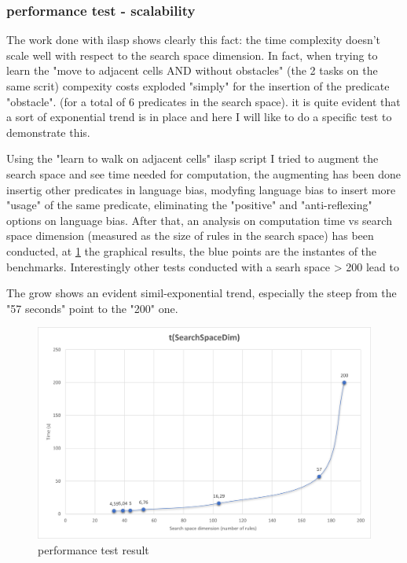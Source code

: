 \subsubsection{performance test - scalability}
The work done with ilasp shows clearly this fact: the time complexity doesn't scale well with respect to the search space dimension. In fact, when trying to learn the "move to adjacent cells AND without obstacles" (the 2 tasks on the same scrit) compexity costs exploded "simply" for the insertion of the predicate "obstacle". (for a total of 6 predicates in the search space). it is quite evident that a sort of exponential trend is in place and here I will like to do a specific test to demonstrate this.

Using the "learn to walk on adjacent cells" ilasp script I tried to augment the search space and see time needed for computation, the augmenting has been done insertig other predicates in language bias, modyfing language bias to insert more "usage" of the same predicate, eliminating the "positive" and "anti-reflexing" options on language bias. After that, an analysis on computation time vs search space dimension (measured as the size of rules in the search space) has been conducted, at \ref{fig:asd4} the graphical results, the blue points are the instantes of the benchmarks. Interestingly other tests conducted with a searh space > 200 lead to 

The grow shows an evident simil-exponential trend, especially the steep from the "57 seconds" point to the "200" one.
\newpage

\begin{figure}
	\centering
	\includegraphics[scale=0.7]{img/GraphTimes.png}
	\caption{performance test result}\label{fig:asd4}
\end{figure}



\newpage